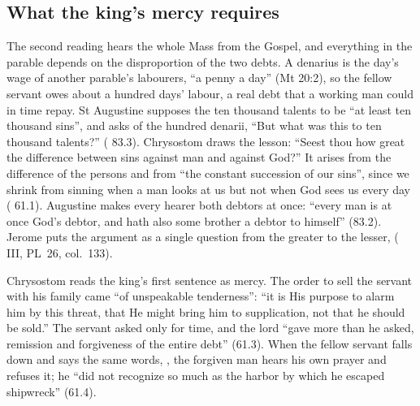 \subsection{What the king's mercy requires}

The second reading hears the whole Mass from the Gospel, and everything in the
parable depends on the disproportion of the two debts. A denarius is the day's
wage of another parable's labourers, ``a penny a day'' (Mt 20:2), so the fellow
servant owes about a hundred days' labour, a real debt that a working man could
in time repay. St Augustine supposes the ten thousand talents to be ``at least
ten thousand sins'', and asks of the hundred denarii, ``But what was this to ten
thousand talents?'' ( 83.3). Chrysostom draws the lesson: ``Seest
thou how great the difference between sins against man and against God?'' It
arises from the difference of the persons and from ``the constant succession of
our sins'', since we shrink from sinning when a man looks at us but not when God
sees us every day ( 61.1). Augustine makes every
hearer both debtors at once: ``every man is at once God's debtor, and hath also
some brother a debtor to himself'' (83.2). Jerome puts the argument as a single
question from the greater to the lesser,  ( III, PL~26, col.~133).

Chrysostom reads the king's first sentence as mercy. The order to sell the
servant with his family came ``of unspeakable tenderness'': ``it is His purpose to
alarm him by this threat, that He might bring him to supplication, not that he
should be sold.'' The servant asked only for time, and the lord ``gave more than he
asked, remission and forgiveness of the entire debt'' (61.3). When the fellow
servant falls down and says the same words, , the forgiven man hears his own prayer and refuses it; he ``did not
recognize so much as the harbor by which he escaped shipwreck'' (61.4).

